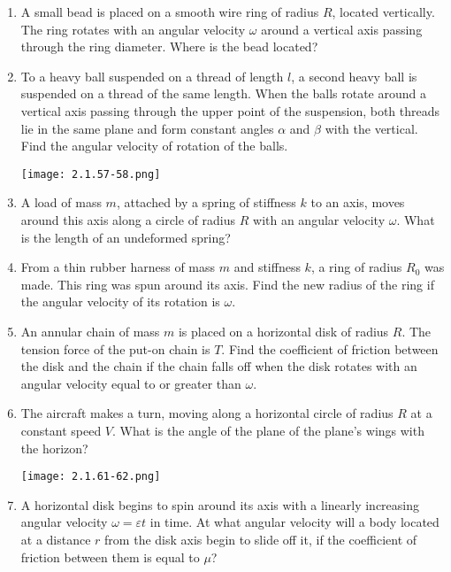 \documentclass{article}
\begin{document}
\begin{enumerate}[label=2.1.\arabic*]
\item A small bead is placed on a smooth wire ring of radius $R$, located vertically. The ring rotates with an angular velocity $\omega$ around a vertical axis passing through the ring diameter. Where is the bead located?

\item To a heavy ball suspended on a thread of length $l$, a second heavy ball is suspended on a thread of the same length. When the balls rotate around a vertical axis passing through the upper point of the suspension, both threads lie in the same plane and form constant angles $\alpha$ and $\beta$ with the vertical. Find the angular velocity of rotation of the balls.

\begin{center}
    \texttt{[image: 2.1.57-58.png]}
\end{center}

\item A load of mass $m$, attached by a spring of stiffness $k$ to an axis, moves around this axis along a circle of radius $R$ with an angular velocity $\omega$. What is the length of an undeformed spring?

\item From a thin rubber harness of mass $m$ and stiffness $k$, a ring of radius $R_0$ was made. This ring was spun around its axis. Find the new radius of the ring if the angular velocity of its rotation is $\omega$.

\item An annular chain of mass $m$ is placed on a horizontal disk of radius $R$. The tension force of the put-on chain is $T$. Find the coefficient of friction between the disk and the chain if the chain falls off when the disk rotates with an angular velocity equal to or greater than $\omega$.

\item The aircraft makes a turn, moving along a horizontal circle of radius $R$ at a constant speed $V$. What is the angle of the plane of the plane's wings with the horizon?

\begin{center}
    \texttt{[image: 2.1.61-62.png]}
\end{center}

\item A horizontal disk begins to spin around its axis with a linearly increasing angular velocity $\omega = \varepsilon t$ in time. At what angular velocity will a body located at a distance $r$ from the disk axis begin to slide off it, if the coefficient of friction between them is equal to $\mu$?


\end{enumerate}
\end{document}
